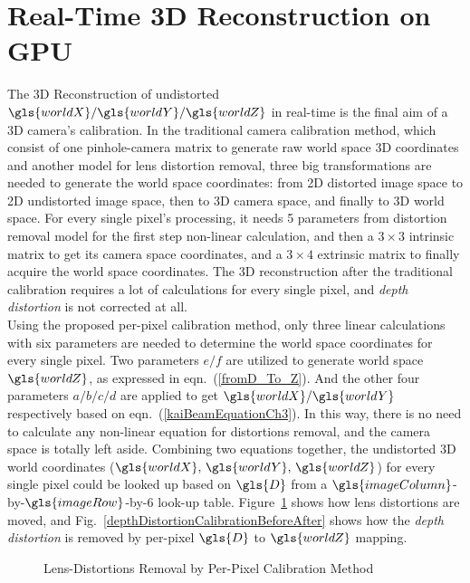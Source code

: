 \section{Real-Time \gls{3D} Reconstruction on \gls{GPU}}
\label{sectionRealTimeReconstruction}
%
The \gls{3D} Reconstruction of undistorted \(\gls{worldX}/\gls{worldY}/\gls{worldZ}\) in real-time is the final aim of a \gls{3D} camera's calibration. In the traditional camera calibration method, which consist of one pinhole-camera matrix to generate raw world space \gls{3D} coordinates and another model for lens distortion removal, three big transformations are needed to generate the world space coordinates: from 2D distorted image space to 2D undistorted image space, then to \gls{3D} camera space, and finally to \gls{3D} world space. For every single pixel's processing, it needs 5 parameters from distortion removal model for the first step non-linear calculation, and then a $3\times3$ intrinsic matrix to get its camera space coordinates, and a $3\times4$ extrinsic matrix to finally acquire the world space coordinates. The \gls{3D} reconstruction after the traditional calibration requires a lot of calculations for every single pixel, and \emph{depth distortion} is not corrected at all.
\\\indent
%
Using the proposed per-pixel calibration method, only three linear calculations with six parameters are needed to determine the world space coordinates for every single pixel. Two parameters \(e/f\) are utilized to generate world space \(\gls{worldZ}\), as expressed in eqn.~(\ref{fromD_To_Z}). And the other four parameters \(a/b/c/d\) are applied to get \(\gls{worldX}/\gls{worldY}\) respectively based on eqn.~(\ref{kaiBeamEquationCh3}). In this way, there is no need to calculate any non-linear equation for distortions removal, and the camera space is totally left aside. Combining two equations together, the undistorted \gls{3D} world coordinates (\(\gls{worldX}, \, \gls{worldY}, \, \gls{worldZ}\)) for every single pixel could be looked up based on \(\gls{D}\) from a \(\gls{imageColumn}\)-by-\(\gls{imageRow}\)-by-\(6\) look-up table. Figure~\ref{perPixelCalibrationBeforeAfter} shows how lens distortions are moved, and Fig.~\ref{depthDistortionCalibrationBeforeAfter} shows how the \emph{depth distortion} is removed by per-pixel \(\gls{D}\) to \(\gls{worldZ}\) mapping.
\begin{figure}[t]
\centering
\hspace*{-0.3cm}
%
%
\caption{Lens-Distortions Removal by Per-Pixel Calibration Method}
\label{perPixelCalibrationBeforeAfter}
\end{figure}%
